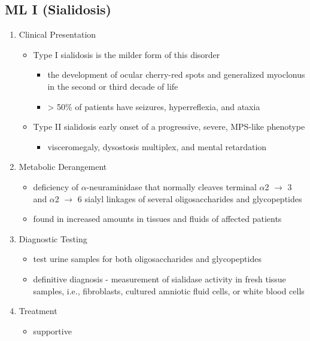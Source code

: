 \documentclass{scrartcl}
\begin{document}
\subsection{ML I (Sialidosis)}
\label{sec:org0d067d7}
\begin{enumerate}
\item Clinical Presentation
\label{sec:org4b3cf92}
\begin{itemize}
\item Type I sialidosis is the milder form of this disorder
\begin{itemize}
\item the development of ocular cherry-red spots and generalized
myoclonus in the second or third decade of life
\item \textgreater{} 50\% of patients have seizures, hyperreflexia, and ataxia
\end{itemize}

\item Type II sialidosis early onset of a progressive, severe, MPS-like
phenotype
\begin{itemize}
\item visceromegaly, dysostosis multiplex, and mental retardation
\end{itemize}
\end{itemize}

\item Metabolic Derangement
\label{sec:org00ec7e4}
\begin{itemize}
\item deficiency of \(\alpha\)-neuraminidase that normally cleaves terminal
\(\alpha\)2 \(\to\) 3 and \(\alpha\)2 \(\to\) 6 sialyl linkages of several
oligosaccharides and glycopeptides
\item found in increased amounts in tissues and fluids of affected patients
\end{itemize}

\item Diagnostic Testing
\label{sec:org1d14b66}
\begin{itemize}
\item test urine samples for both oligosaccharides and glycopeptides
\item definitive diagnosis - measurement of sialidase activity in fresh
tissue samples, i.e., fibroblasts, cultured amniotic fluid cells,
or white blood cells
\end{itemize}

\item Treatment
\label{sec:org443eaab}
\begin{itemize}
\item supportive
\end{itemize}
\end{enumerate}
\end{document}
